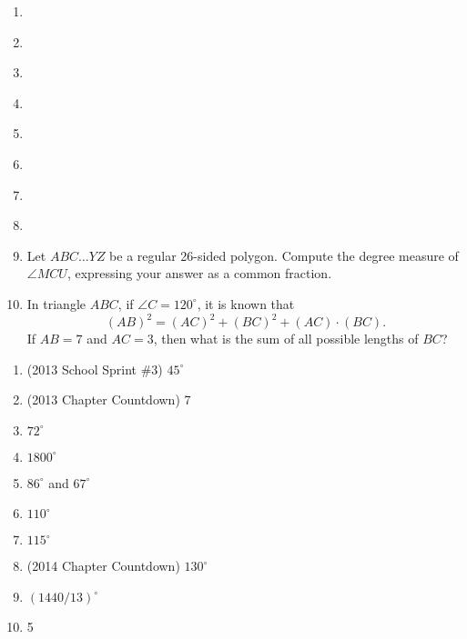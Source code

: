\documentclass{article}
\begin{document}
\begin{enumerate}
\item \underline{\hspace{3in}}\vspace{1cm}
\item \underline{\hspace{3in}}\vspace{1cm}
\item \underline{\hspace{3in}}\vspace{1cm}
\item \underline{\hspace{3in}}\vspace{1cm}
\item \underline{\hspace{3in}}\vspace{1cm}
\item \underline{\hspace{3in}}\vspace{1cm}
\item \underline{\hspace{3in}}\vspace{1cm}
\item \underline{\hspace{3in}}\vspace{1cm}
\item Let $ABC\ldots YZ$ be a regular 26-sided polygon. Compute the degree measure of $\angle MCU$, expressing your answer as a common fraction.
\vspace{1cm}
\item In triangle $ABC$, if $\angle C = 120^{\circ}$, it is known that
\begin{equation*}
(AB)^2 = (AC)^2 + (BC)^2 + (AC)\cdot (BC).
\end{equation*}
If $AB = 7$ and $AC = 3$, then what is the sum of all possible lengths of $BC$?
\end{enumerate}


\newpage

\begin{enumerate}
\item (2013 School Sprint \#3) $45^{\circ}$
\item (2013 Chapter Countdown) 7
\item $72^{\circ}$
\item $1800^{\circ}$
\item $86^{\circ}$ and $67^{\circ}$
\item $110^{\circ}$
\item $115^{\circ}$
\item (2014 Chapter Countdown) $130^{\circ}$
\item $(1440/13)^{\circ}$
\item 5
\end{enumerate}
\end{document}

